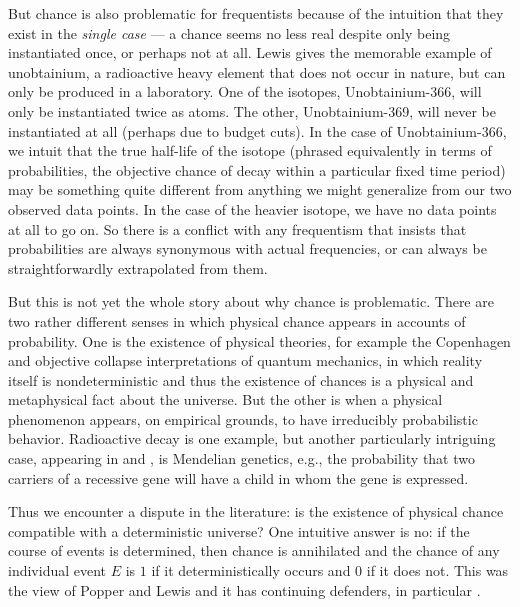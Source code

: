 \documentclass[letterpaper,12pt]{article}
\begin{document}
But chance is also problematic for frequentists because of the intuition that they exist in the \emph{single case} --- a chance seems no less real despite only being instantiated once, or perhaps not at all. Lewis gives the memorable example of unobtainium, a radioactive heavy element that does not occur in nature, but can only be produced in a laboratory. One of the isotopes, Unobtainium-366, will only be instantiated twice as atoms. The other, Unobtainium-369, will never be instantiated at all (perhaps due to budget cuts). In the case of Unobtainium-366, we intuit that the true half-life of the isotope (phrased equivalently in terms of probabilities, the objective chance of decay within a particular fixed time period) may be something quite different from anything we might generalize from our two observed data points. In the case of the heavier isotope, we have no data points at all to go on. So there is a conflict with any frequentism that insists that probabilities are always synonymous with actual frequencies, or can always be straightforwardly extrapolated from them.

But this is not yet the whole story about why chance is problematic. There are two rather different senses in which physical chance appears in accounts of probability. One is the existence of physical theories, for example the Copenhagen and objective collapse interpretations of quantum mechanics, in which reality itself is nondeterministic and thus the existence of chances is a physical and metaphysical fact about the universe. But the other is when a physical phenomenon appears, on empirical grounds, to have irreducibly probabilistic behavior. Radioactive decay is one example, but another particularly intriguing case, appearing in \cite{Hoefer2007-HOETTW} and \cite{Glynn2010-GLYDC}, is Mendelian genetics, e.g., the probability that two carriers of a recessive gene will have a child in whom the gene is expressed.

Thus we encounter a dispute in the literature: is the existence of physical chance compatible with a deterministic universe? One intuitive answer is no: if the course of events is determined, then chance is annihilated and the chance of any individual event $E$ is $1$ if it deterministically occurs and $0$ if it does not. This was the view of Popper and Lewis and it has continuing defenders, in particular \cite{Schaffer2007-SCHDC}.
\end{document}
